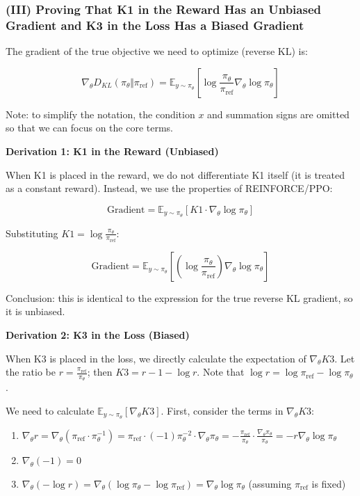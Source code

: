 \hypertarget{iii-proving-that-k1-in-the-reward-has-an-unbiased-gradient-and-k3-in-the-loss-has-a-biased-gradient}{%
\subsubsection{(III) Proving That K1 in the Reward Has an Unbiased Gradient and K3 in the Loss Has a Biased Gradient}\label{iii-proving-that-k1-in-the-reward-has-an-unbiased-gradient-and-k3-in-the-loss-has-a-biased-gradient}}

The gradient of the true objective we need to optimize (reverse KL) is:

\[
\nabla_\theta D_{KL}(\pi_\theta \Vert \pi_{\mathrm{ref}})
=\mathbb{E}_{y\sim\pi_\theta}\left[
\log\frac{\pi_\theta}{\pi_{\mathrm{ref}}}\nabla_\theta\log\pi_\theta
\right]
\]

Note: to simplify the notation, the condition \(x\) and summation signs are omitted so that we can focus on the core terms.

\textbf{Derivation 1: K1 in the Reward (Unbiased)}

When K1 is placed in the reward, we do not differentiate K1 itself (it is treated as a constant reward). Instead, we use the properties of REINFORCE/PPO:

\[
\mathrm{Gradient}
=\mathbb{E}_{y\sim\pi_\theta}\left[K1\cdot\nabla_\theta\log\pi_\theta\right]
\]

Substituting \(K1=\log\frac{\pi_\theta}{\pi_{\mathrm{ref}}}\):

\[
\mathrm{Gradient}
=\mathbb{E}_{y\sim\pi_\theta}\left[
\left(\log\frac{\pi_\theta}{\pi_{\mathrm{ref}}}\right)
\nabla_\theta\log\pi_\theta
\right]
\]

Conclusion: this is identical to the expression for the true reverse KL gradient, so it is unbiased.

\textbf{Derivation 2: K3 in the Loss (Biased)}

When K3 is placed in the loss, we directly calculate the expectation of \(\nabla_\theta K3\). Let the ratio be \(r=\frac{\pi_{\mathrm{ref}}}{\pi_\theta}\); then \(K3=r-1-\log r\). Note that \(\log r=\log\pi_{\mathrm{ref}}-\log\pi_\theta\).

We need to calculate \(\mathbb{E}_{y\sim\pi_\theta}[\nabla_\theta K3]\). First, consider the terms in \(\nabla_\theta K3\):

\begin{enumerate}
\def\labelenumi{\arabic{enumi}.}
\tightlist
\item
  \(\nabla_\theta r=\nabla_\theta(\pi_{\mathrm{ref}}\cdot\pi_\theta^{-1})=\pi_{\mathrm{ref}}\cdot(-1)\pi_\theta^{-2}\cdot\nabla_\theta\pi_\theta=-\frac{\pi_{\mathrm{ref}}}{\pi_\theta}\cdot\frac{\nabla_\theta\pi_\theta}{\pi_\theta}=-r\nabla_\theta\log\pi_\theta\)
\item
  \(\nabla_\theta(-1)=0\)
\item
  \(\nabla_\theta(-\log r)=\nabla_\theta(\log\pi_\theta-\log\pi_{\mathrm{ref}})=\nabla_\theta\log\pi_\theta\) (assuming \(\pi_{\mathrm{ref}}\) is fixed)
\end{enumerate}

